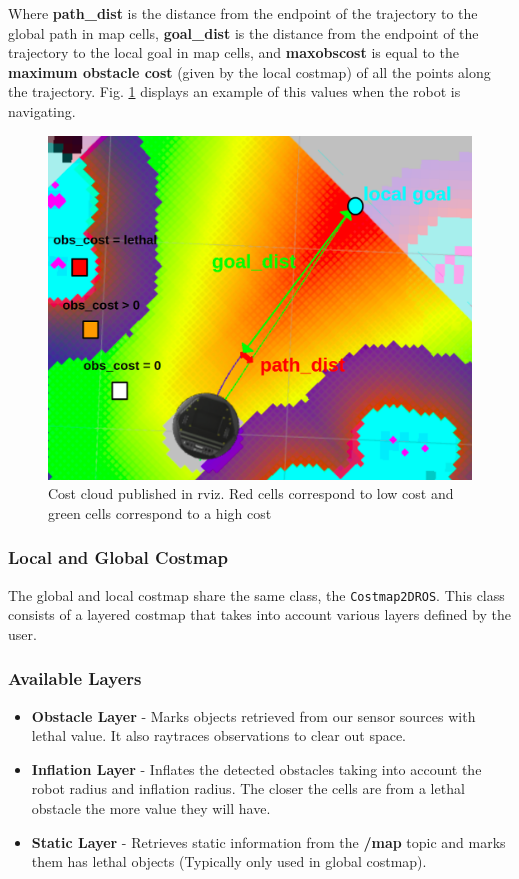 Where \textbf{path\_dist} is the distance from the endpoint of the trajectory to the global path in map cells, \textbf{goal\_dist} is the distance from the endpoint of the trajectory to the local goal in map cells, and \textbf{maxobscost} is equal to the \textbf{maximum obstacle cost} (given by the local costmap) of all the points along the trajectory.
Fig. \ref{fig:costcloud} displays an example of this values when the robot is navigating.
\begin{figure}[!htb]
    \centering
    \includegraphics[width=0.8\linewidth]{imgs/chapter3/costcloud.png}
    \caption[Cost cloud published in rviz]{Cost cloud published in rviz. Red cells correspond to low cost and green cells correspond to a high cost}
    \label{fig:costcloud}
\end{figure}
\subsubsection{Local and Global Costmap}
The global and local costmap share the same class, the  \texttt{Costmap2DROS}. This class consists of a layered costmap that takes into account various layers defined by the user.

\subsubsection*{Available Layers}
\begin{itemize}
    \item \textbf{Obstacle Layer} - Marks objects retrieved from our sensor sources with lethal value. It also raytraces observations to clear out space.
    \item \textbf{Inflation Layer} - Inflates the detected obstacles taking into account the robot radius and inflation radius. The closer the cells are from a lethal obstacle the more value they will have.
    \item \textbf{Static Layer} - Retrieves static information from the \textbf{/map} topic and marks them has lethal objects (Typically only used in global costmap).
\end{itemize}

